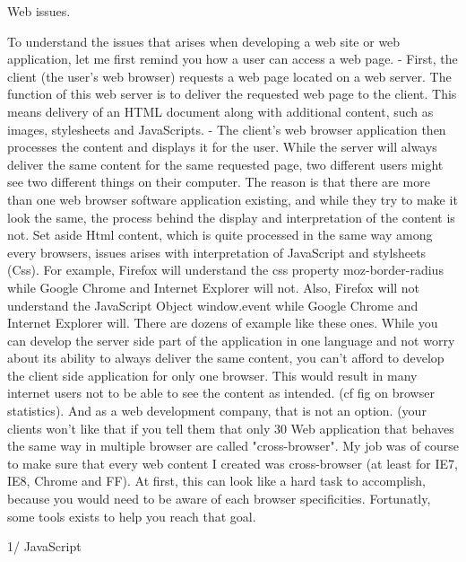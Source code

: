 Web issues.

 
To understand the issues that arises when developing a web site or web application, let me first remind you how a user can access a web page. 
- First, the client (the user's web browser) requests a web page located on a web server. The function of this web server is to deliver the requested web page to the client. This means delivery of an HTML document along with additional content, 
such as images, stylesheets and JavaScripts. 
- The client's web browser application then processes the content and displays it for the user. 
While the server will always deliver the same content for the same requested page, two different users might see two different things on their computer. 
The reason is that there are more than one web browser software application existing, and while they try to make it look the same, the process behind the display and interpretation of the content is not. Set aside Html content, which is quite processed in the same way among every browsers, issues arises with interpretation of
JavaScript and stylsheets (Css). For example, Firefox will understand the css property moz-border-radius while Google Chrome and Internet Explorer will not. Also, Firefox will not understand the JavaScript Object window.event while Google Chrome and Internet Explorer will. There are dozens of example like these ones.
While you can develop the server side part of the application in one language and not worry about its ability to always deliver the same content, you can't afford to develop the client side application for only one browser. This would result in many internet users not to be able to see the content as intended. (cf fig on browser statistics).
And as a web development company, that is not an option. (your clients won't like that if you tell them that only 30 
Web application that behaves the same way in multiple browser are called "cross-browser". 
My job was of course to make sure that every web content I created was cross-browser (at least for IE7, IE8, Chrome and FF).
At first, this can look like a hard task to accomplish, because you would need to be aware of each browser specificities. Fortunatly, some tools exists to help you reach that goal.

1/ JavaScript

